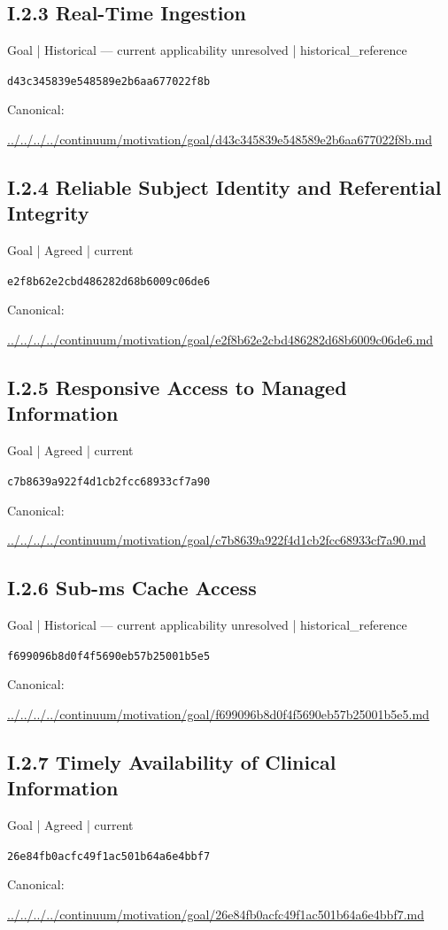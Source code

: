 \documentclass[10pt,a4paper]{article}
\begin{document}
\subsection*{I.2.3 Real-Time Ingestion}
{\small Goal | Historical — current applicability unresolved | historical\_reference}\par
\texttt{d43c345839e548589e2b6aa677022f8b}\par
Canonical: \par
{\footnotesize\url{../../../../continuum/motivation/goal/d43c345839e548589e2b6aa677022f8b.md}}\par
\subsection*{I.2.4 Reliable Subject Identity and Referential Integrity}
{\small Goal | Agreed | current}\par
\texttt{e2f8b62e2cbd486282d68b6009c06de6}\par
Canonical: \par
{\footnotesize\url{../../../../continuum/motivation/goal/e2f8b62e2cbd486282d68b6009c06de6.md}}\par
\subsection*{I.2.5 Responsive Access to Managed Information}
{\small Goal | Agreed | current}\par
\texttt{c7b8639a922f4d1cb2fcc68933cf7a90}\par
Canonical: \par
{\footnotesize\url{../../../../continuum/motivation/goal/c7b8639a922f4d1cb2fcc68933cf7a90.md}}\par
\subsection*{I.2.6 Sub-ms Cache Access}
{\small Goal | Historical — current applicability unresolved | historical\_reference}\par
\texttt{f699096b8d0f4f5690eb57b25001b5e5}\par
Canonical: \par
{\footnotesize\url{../../../../continuum/motivation/goal/f699096b8d0f4f5690eb57b25001b5e5.md}}\par
\subsection*{I.2.7 Timely Availability of Clinical Information}
{\small Goal | Agreed | current}\par
\texttt{26e84fb0acfc49f1ac501b64a6e4bbf7}\par
Canonical: \par
{\footnotesize\url{../../../../continuum/motivation/goal/26e84fb0acfc49f1ac501b64a6e4bbf7.md}}\par
\end{document}
